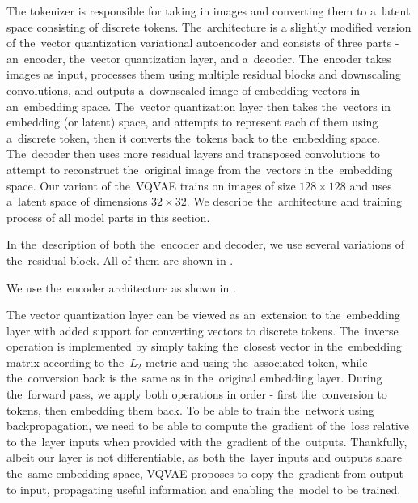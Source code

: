 The tokenizer is responsible for taking in images and converting them to a~latent space consisting of discrete tokens. The~architecture is a slightly modified version of the~vector quantization variational autoencoder \citep{vqvae} and consists of three parts - an~encoder, the~vector quantization layer, and a~decoder. The~encoder takes images as input, processes them using multiple residual blocks and downscaling convolutions, and outputs a~downscaled image of embedding vectors in an~embedding space. The~vector quantization layer then takes the~vectors in embedding (or latent) space, and attempts to represent each of them using a~discrete token, then it converts the~tokens back to the~embedding space. The~decoder then uses more residual layers and transposed convolutions to attempt to reconstruct the~original image from the~vectors in the~embedding space. Our variant of the~VQVAE trains on images of size $128 \times 128$ and uses a~latent space of dimensions $32 \times 32$. We describe the~architecture and training process of all model parts in this section.

In the~description of both the~encoder and decoder, we use several variations of the~residual block. All of them are shown in .


We use the~encoder architecture as shown in .



The vector quantization layer can be viewed as an~extension to the~embedding layer with added support for converting vectors to discrete tokens. The~inverse operation is implemented by simply taking the~closest vector in the~embedding matrix according to the~$L_2$ metric and using the~associated token, while the~conversion back is the~same as in the~original embedding layer. During the~forward pass, we apply both operations in order - first the~conversion to tokens, then embedding them back. To be able to train the~network using backpropagation, we need to be able to compute the~gradient of the~loss relative to the~layer inputs when provided with the~gradient of the~outputs. Thankfully, albeit our layer is not differentiable, as both the~layer inputs and outputs share the~same embedding space, VQVAE proposes to copy the~gradient from output to input, propagating useful information and enabling the~model to be trained.


